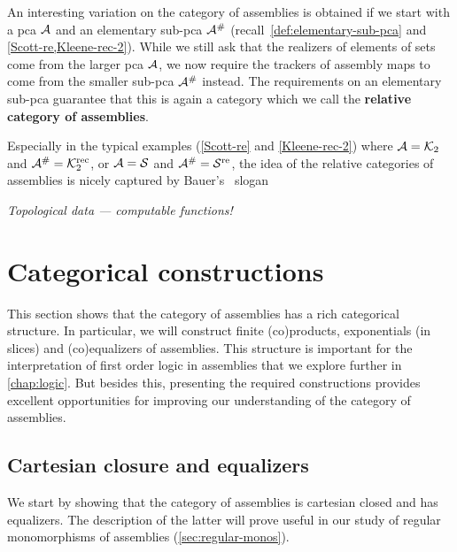 \begin{remark}
  An interesting variation on the category of assemblies is obtained if we start
  with a pca \(\AA\) and an elementary sub-pca \(\AA^\#\)
  (recall~\cref{def:elementary-sub-pca} and \cref{Scott-re,Kleene-rec-2}).
  While we still ask that the realizers of elements of sets come from the
  larger pca \(\AA\), we now require the trackers of assembly maps to come from
  the smaller sub-pca \(\AA^\#\) instead.
  The requirements on an elementary sub-pca guarantee that this is again a
  category which we call the \textbf{relative category of assemblies}.

  Especially in the typical examples (\ref{Scott-re} and \ref{Kleene-rec-2})
  where \(\AA = \Ktwo\) and \(\AA^\# = \Ktworec\), or \(\AA = \Scott\) and
  \(\AA^\# = \Scottre\), the idea of the relative categories of assemblies is
  nicely captured by Bauer's~\cite[p.~36 and 45]{Bauer2006,Bauer2023}
  slogan
  \begin{center}
    \emph{Topological data --- computable functions!}
  \end{center}
\end{remark}

\section{Categorical constructions}

This section shows that the category of assemblies has a rich categorical
structure. In particular, we will construct finite (co)products, exponentials
(in slices) and (co)equalizers of assemblies.
%
This structure is important for the interpretation of first order logic in
assemblies that we explore further in \cref{chap:logic}.
%
But besides this, presenting the required constructions provides excellent
opportunities for improving our understanding of the category of assemblies.

\subsection{Cartesian closure and equalizers}
We start by showing that the category of assemblies is cartesian closed and has
equalizers. The description of the latter will prove useful in our study of
regular monomorphisms of assemblies (\cref{sec:regular-monos}).

